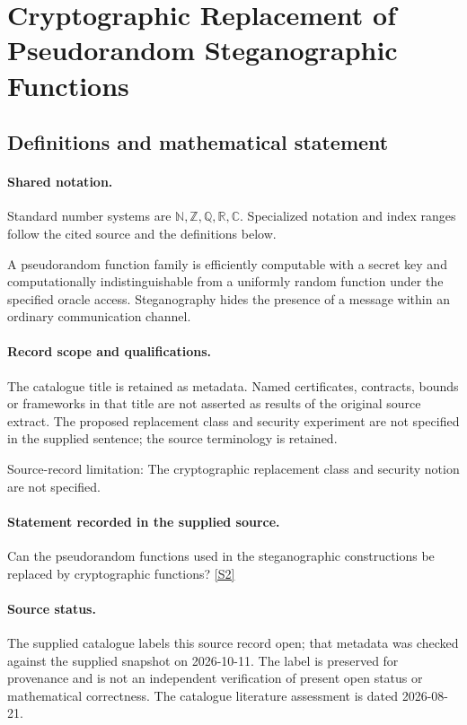 \documentclass[11pt]{article}
\newcommand{\sref}[2]{\hyperlink{source:#1:#2}{[S#2]}}
\begin{document}
\section{Cryptographic Replacement of Pseudorandom Steganographic Functions}\label{statement}

\subsection{Definitions and mathematical statement}

\paragraph{Shared notation.}Standard number systems are $\mathbb N,\mathbb Z,\mathbb Q,\mathbb R,\mathbb C$. Specialized notation and index ranges follow the cited source and the definitions below.


A pseudorandom function family is efficiently computable with a secret key and computationally indistinguishable from a uniformly random function under the specified oracle access. Steganography hides the presence of a message within an ordinary communication channel.
\paragraph{Record scope and qualifications.}
The catalogue title is retained as metadata. Named certificates, contracts, bounds or frameworks in that title are not asserted as results of the original source extract.
The proposed replacement class and security experiment are not specified in the supplied sentence; the source terminology is retained.

Source-record limitation: The cryptographic replacement class and security notion are not specified.
\paragraph{Statement recorded in the supplied source.}
Can the pseudorandom functions used in the steganographic constructions be replaced by cryptographic functions? \sref{statement}{2}
\paragraph{Source status.}
The supplied catalogue labels this source record open; that metadata was checked against the supplied snapshot on 2026-10-11. The label is preserved for provenance and is not an independent verification of present open status or mathematical correctness. The catalogue literature assessment is dated 2026-08-21.
\end{document}
